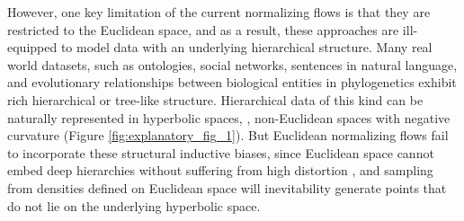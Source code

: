 However, one key limitation of the current normalizing flows is that they are restricted to the Euclidean space, and as a result, these approaches are ill-equipped to model data with an underlying hierarchical structure. %
Many real world datasets, such as ontologies, social networks, sentences in natural language, and evolutionary relationships between biological entities in phylogenetics exhibit rich hierarchical or tree-like structure.
Hierarchical data of this kind can be naturally represented in hyperbolic spaces, \ie, non-Euclidean spaces with negative curvature (Figure \ref{fig:explanatory_fig_1}). 
But Euclidean normalizing flows fail to incorporate these structural inductive biases, since Euclidean space cannot embed deep hierarchies without suffering from high distortion \cite{sarkar2011low}, and sampling from densities defined on Euclidean space will inevitability generate points that do not lie on the underlying hyperbolic space. 



